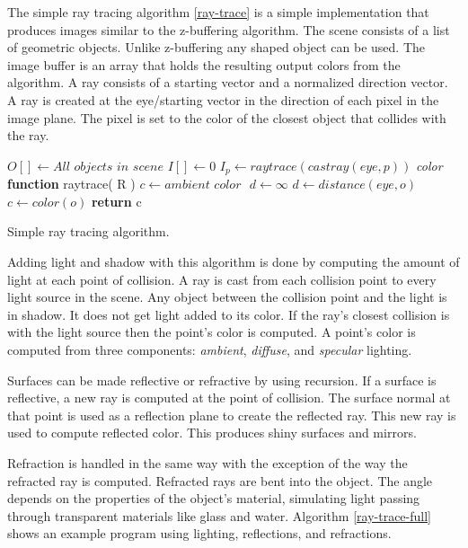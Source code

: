 The simple ray tracing algorithm \ref{ray-trace} is a simple implementation that produces images similar to the z-buffering algorithm.  The scene consists of a list of geometric objects.  Unlike z-buffering any shaped object can be used.  The image buffer is an array that holds the resulting output colors from the algorithm.  A ray consists of a starting vector and a normalized direction vector.  A ray is created at the eye/starting vector in the direction of each pixel in the image plane.  The pixel is set to the color of the closest object that collides with the ray.  

\begin{algorithm}[H]
\begin{algorithmic}[1]
\STATE $O[ ] \gets \textit{All objects in scene}$ 
\STATE $I[] \gets 0$ 
\STATE
{}
	\STATE $I_{p} \gets raytrace( castray( eye, p ))$
\ENDFOR
\STATE 
\STATE \textit{color} \textbf{function} raytrace(  R )
	\STATE $c  \gets \textit{ambient color } $
	\STATE $d \gets \infty $
				\STATE $d \gets distance( \textit{eye}, o )$
				\STATE $c \gets color( o )$
			\ENDIF
		\ENDIF
	\ENDFOR
	\STATE \textbf{return} c

\end{algorithmic}
\caption{Simple ray tracing algorithm.}
\label{ray-trace}
\end{algorithm}

Adding light and shadow with this algorithm is done by computing the amount of light at each point of collision.  A ray is cast from each collision point to every light source in the scene.  Any object between the collision point and the light is in shadow.   It does not get light added to its color. If the ray's closest collision is with the light source then the point's color is computed.  A point's color is computed from three components: \textit{ambient}, \textit{diffuse}, and \textit{specular} lighting\cite{kalinini:2008}.

Surfaces can be made reflective or refractive by using recursion.  If a surface is reflective, a new ray is computed at the point of collision.   The surface normal at that point  is used as a reflection plane to create the reflected ray.  This new ray is used to compute reflected color.  This produces shiny surfaces and mirrors.  

Refraction is handled in the same way with the exception of the way the refracted ray is computed.  Refracted rays are bent into the object.  The angle depends on the properties of the object's material,  simulating  light passing through transparent materials like glass and water. Algorithm \ref{ray-trace-full} shows an example program using lighting, reflections, and refractions.
  
